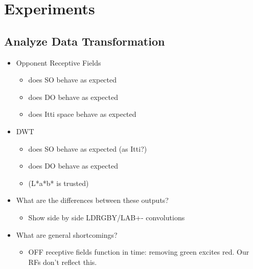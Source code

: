 \documentclass[journal,onecolumn]{IEEEtran}
\begin{document}
%
%
%
\section{Experiments}

\subsection*{Analyze Data Transformation}
\begin{itemize}
    \item Opponent Receptive Fields
    \begin{itemize}
        \item does SO behave as expected
        \item does DO behave as expected
        \item does Itti space behave as expected
    \end{itemize}
    \item DWT
    \begin{itemize}
        \item does SO behave as expected (as Itti?)
        \item does DO behave as expected
        \item (L*a*b* is trusted)
    \end{itemize}
    \item What are the differences between these outputs?
    \begin{itemize}
        \item Show side by side LDRGBY/LAB+- convolutions
    \end{itemize}
    \item What are general shortcomings?
    \begin{itemize}
        \item OFF receptive fields function in time: removing green excites red. Our RFs don't reflect this.
    \end{itemize}
\end{itemize}
\end{document}
